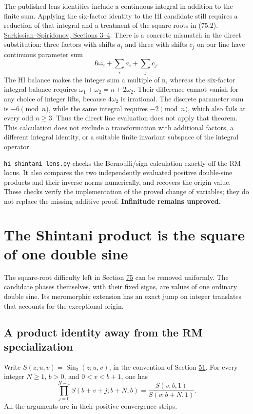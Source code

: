 \documentclass[11pt,reqno]{amsart}
\theoremstyle{plain}
\begin{document}
The published lens identities include a continuous integral in addition
to the finite sum. Applying the six-factor identity to the HI candidate
still requires a reduction of that integral and a treatment of the
square roots in (75.2).
\href{https://arxiv.org/html/1910.11747\#S3}{Sarkissian--Spiridonov, Sections 3--4}.
There is a concrete mismatch in the direct substitution: three factors
with shifts \(a_i\) and three with shifts \(c_j\) on our line have
continuous parameter sum
\[
 6\omega_2+\sum_i a_i+\sum_j c_j.
\]
The HI balance makes the integer sum a multiple of n, whereas the
six-factor integral balance requires \(\omega_1+\omega_2=n+2\omega_2\).
Their difference cannot vanish for any choice of integer lifts, because
\(4\omega_2\) is irrational. The discrete parameter sum is
\(-6\pmod n\), while the same integral requires \(-2\pmod n\),
which also fails at every odd \(n\ge3\). Thus the direct line evaluation
does not apply that theorem. This calculation does not exclude a transformation
with additional factors, a different integral identity, or a suitable
finite invariant subspace of the integral operator.

\texttt{hi\_\allowbreak shintani\_\allowbreak lens.py} checks the Bernoulli/sign calculation exactly off
the RM locus. It also compares the two independently evaluated positive
double-sine products and their inverse norms numerically, and recovers
the origin value. These checks verify the implementation of the proved
change of variables; they do not replace the missing additive proof.
\textbf{Infinitude remains unproved.}

\section{The Shintani product is the square of one double sine}\label{sec:76}

The square-root difficulty left in Section \hyperref[sec:75]{75} can be removed uniformly.
The candidate phases themselves, with their fixed signs, are values of
one ordinary double sine. Its meromorphic extension has an exact jump
on integer translates that accounts for the exceptional origin.

\subsection{A product identity away from the RM specialization}\label{sec:76.1}

Write \(S(z;u,v)=\operatorname{Sin}_2(z;u,v)\), in the convention
of Section \hyperref[sec:51]{51}. For every integer \(N\ge1\), \(b>0\), and
\(0<v<b+1\), one has
\begin{equation*}
 \boxed{\displaystyle
 \prod_{j=0}^{N-1}S(b+v+j;b+N,b)
 =\frac{S(v;b,1)}{S(v;b+N,1)}.}
 \tag{76.1}
\end{equation*}
All the arguments are in their positive convergence strips.
\end{document}
